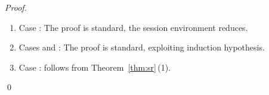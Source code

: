 \begin{proof}
\begin{enumerate}[1.]
		\item	Case :
			The proof is standard, the session environment reduces.


		\item	Cases  and :
			The proof is standard, exploiting induction hypothesis. 

		\item	Case :
			follows from Theorem~\ref{thm:sr}\,(1).
	\end{enumerate}
	\qed
\end{proof}
